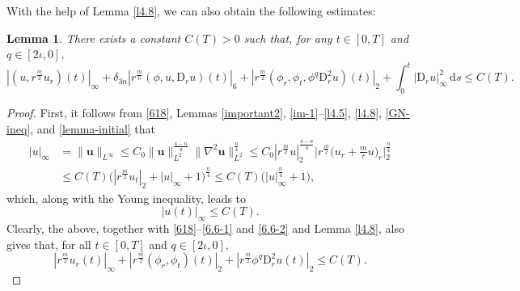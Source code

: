 \documentclass[11pt,reqno]{amsart}
\newtheorem{lem}{Lemma}[section]
\numberwithin{rk}{section}
\numberwithin{prop}{section}
\numberwithin{mydef}{section}
\numberwithin{lem}{section}
\numberwithin{equation}{section}
\numberwithin{thm}{section}
\begin{document}
With the help of Lemma \ref{l4.8}, we can also obtain the following estimates:

\begin{lem}\label{lemma66}
There exists a constant $C(T)>0$ such that, for any $t\in [0,T]$ and $q\in [2\iota,0]$,
\begin{equation*}
|(u,r^\frac{m}{2}u_r)(t)|_\infty+\delta_{3n}|r^\frac{m}{6}(\phi,u,\mathrm{D}_r u)(t)|_{6} + |r^{\frac{m}{2}} (\phi_r,\phi_t,\phi^{q}\mathrm{D}_r^2 u)(t)|_2+ \int_0^t |\mathrm{D}_r u|_\infty^2\,\mathrm{d}s \leq C(T).
\end{equation*}
\end{lem}
\begin{proof}

First, it follows from \eqref{618}, Lemmas \ref{important2}, \ref{im-1}--\ref{l4.5}, \ref{l4.8}, \ref{GN-ineq}, and \ref{lemma-initial} that
\begin{equation*} 
\begin{aligned}
|u|_{\infty}&=\|\boldsymbol{u}\|_{L^\infty}\leq C_0\|\boldsymbol{u}\|_{L^2}^\frac{4-n}{4}\|\nabla^2\boldsymbol{u}\|_{L^2}^\frac{n}{4}\leq C_0|r^\frac{m}{2}u|_2^\frac{4-n}{4} \Big|r^\frac{m}{2} \big(u_r+\frac{m}{r}u\big)_r\Big|_2^\frac{n}{4}\\
&\leq C(T)\big(|r^\frac{m}{2}u_t|_2+|u|_\infty+1\big)^\frac{n}{4}\leq C(T)\big(|u|_\infty^\frac{n}{4}+1\big),
\end{aligned}
\end{equation*}
which, along with the Young inequality, leads to
\begin{equation*} 
|u(t)|_{\infty} \leq C(T).
\end{equation*}
Clearly, the above, together with \eqref{618}--\eqref{6.6-1} and \eqref{6.6-2} and Lemma \ref{l4.8}, also gives that, for all $t\in [0,T]$ and $q\in [2\iota,0]$,
\begin{equation}\label{6026}
|r^\frac{m}{2}u_r(t)|_\infty + |r^{\frac{m}{2}} (\phi_r,\phi_t)(t)|_2 +|r^{\frac{m}{2}}\phi^{q}\mathrm{D}_r^2 u(t)|_2 \leq C(T).
\end{equation}



\end{proof}
\end{document}
